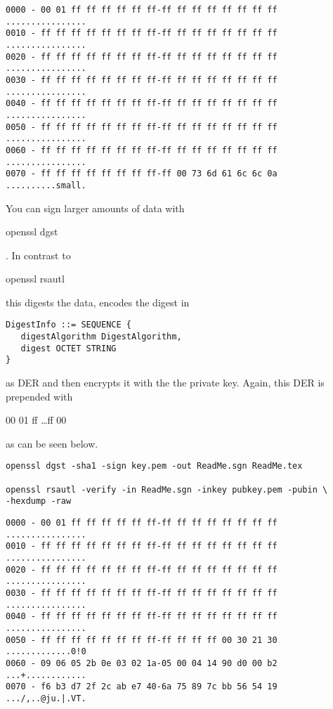 \documentclass{article}
\begin{document}
\begin{lstlisting}
0000 - 00 01 ff ff ff ff ff ff-ff ff ff ff ff ff ff ff   ................
0010 - ff ff ff ff ff ff ff ff-ff ff ff ff ff ff ff ff   ................
0020 - ff ff ff ff ff ff ff ff-ff ff ff ff ff ff ff ff   ................
0030 - ff ff ff ff ff ff ff ff-ff ff ff ff ff ff ff ff   ................
0040 - ff ff ff ff ff ff ff ff-ff ff ff ff ff ff ff ff   ................
0050 - ff ff ff ff ff ff ff ff-ff ff ff ff ff ff ff ff   ................
0060 - ff ff ff ff ff ff ff ff-ff ff ff ff ff ff ff ff   ................
0070 - ff ff ff ff ff ff ff ff-ff 00 73 6d 61 6c 6c 0a   ..........small.
\end{lstlisting}

You can sign larger amounts of data with 
\begin{tt}openssl dgst\end{tt}.
In contrast to 
\begin{tt}openssl rsautl\end{tt}
this digests
the data, encodes the digest in

\lstset{language=ASN1}
\begin{lstlisting}[frame=single]
DigestInfo ::= SEQUENCE {
   digestAlgorithm DigestAlgorithm,
   digest OCTET STRING
}
\end{lstlisting}

as DER and then encrypts it with the the private key.
Again, this DER is prepended with 
\begin{tt}00 01 ff \ldots ff 00\end{tt} as can be seen below.

\lstset{language=shell,basicstyle=\ttfamily\small}
\begin{lstlisting}[frame=single]
openssl dgst -sha1 -sign key.pem -out ReadMe.sgn ReadMe.tex

openssl rsautl -verify -in ReadMe.sgn -inkey pubkey.pem -pubin \
-hexdump -raw
\end{lstlisting}

\begin{lstlisting}
0000 - 00 01 ff ff ff ff ff ff-ff ff ff ff ff ff ff ff   ................
0010 - ff ff ff ff ff ff ff ff-ff ff ff ff ff ff ff ff   ................
0020 - ff ff ff ff ff ff ff ff-ff ff ff ff ff ff ff ff   ................
0030 - ff ff ff ff ff ff ff ff-ff ff ff ff ff ff ff ff   ................
0040 - ff ff ff ff ff ff ff ff-ff ff ff ff ff ff ff ff   ................
0050 - ff ff ff ff ff ff ff ff-ff ff ff ff 00 30 21 30   .............0!0
0060 - 09 06 05 2b 0e 03 02 1a-05 00 04 14 90 d0 00 b2   ...+............
0070 - f6 b3 d7 2f 2c ab e7 40-6a 75 89 7c bb 56 54 19   .../,..@ju.|.VT.
\end{lstlisting}
\end{document}

